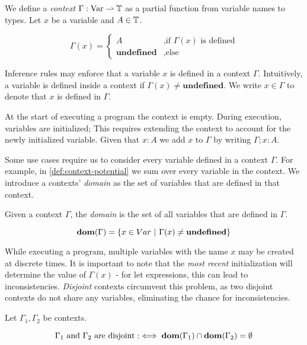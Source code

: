 \begin{definition}[Context]\label{def:context}
   We define a \emph{context} \(\Gamma : \text{Var} \rightharpoonup \text{\ensuremath{\mathbb{T}}}\) as a partial function from variable names to types. Let \(x\) be a variable and \(A \in \mathbb{T}\).

   \[
      \Gamma(x) = 
      \begin{cases}
	 A		      & \mbox{,if } \Gamma(x) \text{ is defined}\\
	 \textbf{undefined}   & \mbox{,else } 
      \end{cases}
   \]
\end{definition}

Inference rules may enforce that a variable \(x\) is defined in a context \(\Gamma\). Intuitively, a variable is defined inside a context if \(\Gamma(x) \neq \textbf{undefined}\). We write \(x \in \Gamma\) to denote that \(x\) is defined in \(\Gamma\).

At the start of executing a program the context is empty. During execution, variables are initialized; This requires extending the context to account for the newly initialized variable. Given that \(x : A\) we add \(x\) to \(\Gamma\) by writing \(\Gamma; x : A\).

Some use cases require us to consider every variable defined in a context \(\Gamma\). For example, in \cref{def:context-potential} we sum over every variable in the context. We introduce a contexts' \emph{domain} as the set of variables that are defined in that context.

\begin{definition}\label{def:context-domain}
   Given a context \(\Gamma\), the \emph{domain} is the set of all variables that are defined in \(\Gamma\).
   
   \[
      \textbf{dom}(\Gamma) = \{x \in Var ~|~ \Gamma(x) \neq \textbf{undefined}\} 
   \]
\end{definition}

While executing a program, multiple variables with the name \(x\) may be created at discrete times. It is important to note that the \emph{most recent} initialization will determine the value of \(\Gamma(x)\) - for let expressions, this can lead to inconsistencies. \emph{Disjoint} contexts circumvent this problem, as two disjoint contexts do not share any variables, eliminating the chance for inconsistencies.

\begin{definition}\label{def:disjoint-contexts}
   Let \(\Gamma_1, \Gamma_2\) be contexts. 

   \[
      \Gamma_1 \text{ and } \Gamma_2 \text{ are disjoint} :\iff \textbf{dom}(\Gamma_1) \cap \textbf{dom}(\Gamma_2) = \emptyset
   \]
\end{definition}

